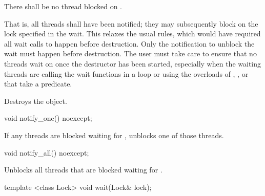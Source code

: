 \begin{itemdescr}
\pnum
\precondition There shall be no thread blocked on . \begin{note} That is, all
threads shall have been notified; they may subsequently block on the lock specified in the
wait.
This relaxes the usual rules, which would have required all wait calls to happen before
destruction. Only the notification to unblock the wait must happen before destruction.
The user must take care to ensure that no threads wait on  once the destructor has
been started, especially when the waiting threads are calling the wait functions in a loop or
using the overloads of , , or  that take a predicate.
\end{note}

\pnum\effects Destroys the object.
\end{itemdescr}

%
%
\begin{itemdecl}
void notify_one() noexcept;
\end{itemdecl}

\begin{itemdescr}
\pnum\effects If any threads are blocked waiting for , unblocks one of those threads.
\end{itemdescr}

%
%
\begin{itemdecl}
void notify_all() noexcept;
\end{itemdecl}

\begin{itemdescr}
\pnum\effects Unblocks all threads that are blocked waiting for .
\end{itemdescr}

%
%
\begin{itemdecl}
template <class Lock>
  void wait(Lock& lock);
\end{itemdecl}

